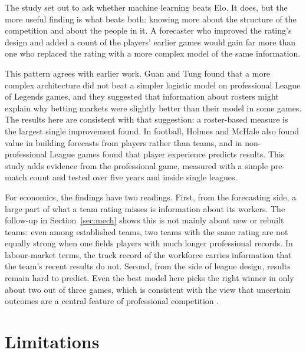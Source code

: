 \documentclass[12pt,a4paper]{article}
\begin{document}
The study set out to ask whether machine learning beats Elo. It does, but the more useful finding is what beats both: knowing more about the structure of the competition and about the people in it. A forecaster who improved the rating's design and added a count of the players' earlier games would gain far more than one who replaced the rating with a more complex model of the same information.

This pattern agrees with earlier work. Guan and Tung \citeyearpar{guan2026} found that a more complex architecture did not beat a simpler logistic model on professional League of Legends games, and they suggested that information about rosters might explain why betting markets were slightly better than their model in some games. The results here are consistent with that suggestion: a roster-based measure is the largest single improvement found. In football, Holmes and McHale \citeyearpar{holmes2024} also found value in building forecasts from players rather than teams, and in non-professional League games \citet{do2021} found that player experience predicts results. This study adds evidence from the professional game, measured with a simple pre-match count and tested over five years and inside single leagues.

For economics, the findings have two readings. First, from the forecasting side, a large part of what a team rating misses is information about its workers. The follow-up in Section~\ref{sec:mech} shows this is not mainly about new or rebuilt teams: even among established teams, two teams with the same rating are not equally strong when one fields players with much longer professional records. In labour-market terms, the track record of the workforce carries information that the team's recent results do not. Second, from the side of league design, results remain hard to predict. Even the best model here picks the right winner in only about two out of three games, which is consistent with the view that uncertain outcomes are a central feature of professional competition \citep{rottenberg1956}.

\section{Limitations}\label{sec:limits}
\end{document}

